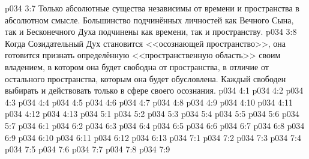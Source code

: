 \vs p034 3:7 \pc Только абсолютные существа независимы от времени и пространства в абсолютном смысле. Большинство подчинённых личностей как Вечного Сына, так и Бесконечного Духа подчинены как времени, так и пространству.
\vs p034 3:8 Когда Созидательный Дух становится <<осознающей пространство>>, она готовится признать определённую <<пространственную область>> своим владением, в котором она будет свободна от пространства, в отличие от остального пространства, которым она будет обусловлена. Каждый свободен выбирать и действовать только в сфере своего осознания.
\vs p034 4:1 
\vs p034 4:2 
\vs p034 4:3 
\vs p034 4:4 
\vs p034 4:5 \pc 
\vs p034 4:6 
\vs p034 4:7 
\vs p034 4:8 \pc 
\vs p034 4:9 
\vs p034 4:10 \pc 
\vs p034 4:11 \pc 
\vs p034 4:12 
\vs p034 4:13 
\vs p034 5:1 
\vs p034 5:2 
\vs p034 5:3 \pc 
\vs p034 5:4 
\vs p034 5:5 
\vs p034 5:6 \pc 
\vs p034 5:7 
\vs p034 6:1 
\vs p034 6:2 
\vs p034 6:3 \pc 
\vs p034 6:4 
\vs p034 6:5 \pc 
\vs p034 6:6 
\vs p034 6:7 
\vs p034 6:8 
\vs p034 6:9 \pc 
\vs p034 6:10 
\vs p034 6:11 \pc 
\vs p034 6:12 
\vs p034 6:13 
\vs p034 7:1 
\vs p034 7:2 
\vs p034 7:3 
\vs p034 7:4 \pc 
\vs p034 7:5 
\vs p034 7:6 \pc 
\vs p034 7:7 
\vs p034 7:8 \pc 
\vsetoff
\vs p034 7:9 
\quizlink
